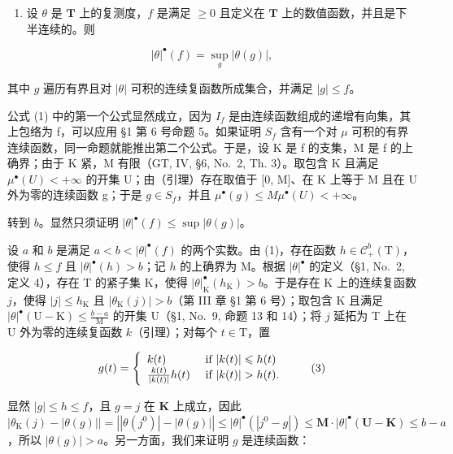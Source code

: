 \begin{enumerate}
\def\labelenumi{\alph{enumi})}
\setcounter{enumi}{1}
\tightlist
\item
  设 \(\theta\) 是 \(\mathbf{T}\) 上的复测度，\(f\) 是满足 \(\geqslant 0\) 且定义在 \(\mathbf{T}\) 上的数值函数，并且是下半连续的。则
\end{enumerate}

\[
| \theta | ^ {\bullet} (f) = \sup _ {g} | \theta (g) |,\tag{2}
\]

其中 \(g\) 遍历有界且对 \(|\theta|\) 可积的连续复函数所成集合，并满足 \(|g| \leqslant f\)。

公式 (1) 中的第一个公式显然成立，因为 \(I_{f}\) 是由连续函数组成的递增有向集，其上包络为 f，可以应用 §1 第 6 号命题 5。如果证明 \(S_{f}\) 含有一个对 \(\mu\) 可积的有界连续函数，同一命题就能推出第二个公式。于是，设 K 是 f 的支集，M 是 f 的上确界；由于 K 紧，M 有限（GT, IV, §6, No.~2, Th. 3）。取包含 K 且满足 \(\mu^{\bullet}(U) < +\infty\) 的开集 U；由（引理）存在取值于 {[}0, M{]}、在 K 上等于 M 且在 U 外为零的连续函数 g；于是 \(g \in S_{f}\)，并且 \(\mu^{\bullet}(g) \leqslant M\mu^{\bullet}(U) < +\infty\)。

转到 \(b\)。显然只须证明 \(|\theta|^{\bullet}(f) \leqslant \sup |\theta(g)|\)。

设 \(a\) 和 \(b\) 是满足 \(a < b < |\theta|^{\bullet}(f)\) 的两个实数。由 (1)，存在函数 \(h \in \mathcal{C}_{+}^{b}(\mathrm{T})\)，使得 \(h \leqslant f\) 且 \(|\theta|^{\bullet}(h) > b\)；记 \(h\) 的上确界为 M。根据 \(|\theta|^{\bullet}\) 的定义（§1, No.~2, 定义 4），存在 T 的紧子集 K，使得 \(|\theta|_{\mathrm{K}}^{\bullet}(h_{\mathrm{K}}) > b\)。于是存在 K 上的连续复函数 \(j\)，使得 \(|j| \leqslant h_{\mathrm{K}}\) 且 \(|\theta_{\mathrm{K}}(j)| > b\)（第 III 章 §1 第 6 号）；取包含 K 且满足 \(|\theta|^{\bullet}(\mathrm{U} - \mathrm{K}) \leqslant \frac{b - a}{\mathrm{M}}\) 的开集 U（§1, No.~9, 命题 13 和 14）；将 \(j\) 延拓为 T 上在 U 外为零的连续复函数 \(k\)（引理）；对每个 \(t \in \mathrm{T}\)，置

\[
g (t) = \left\{ \begin{array}{l l} k (t) & \text { if } | k (t) | \leqslant h (t) \\ \frac {k (t)}{| k (t) |} h (t) & \text { if } | k (t) | > h (t). \end{array} \right.\tag{3}
\]

显然 \(|g| \leqslant h \leqslant f\)，且 \(g = j\) 在 \(\mathbf{K}\) 上成立，因此 \(\left|\theta_{\mathrm{K}}(j) - |\theta(g)|\right| = \left|\left|\theta(j^0)\right| - |\theta(g)|\right| \leqslant |\theta|^{\bullet}(|j^0 - g|) \leqslant \mathbf{M} \cdot |\theta|^{\bullet}(\mathbf{U} - \mathbf{K}) \leqslant b - a\)，所以 \(|\theta(g)| > a\)。另一方面，我们来证明 \(g\) 是连续函数：

